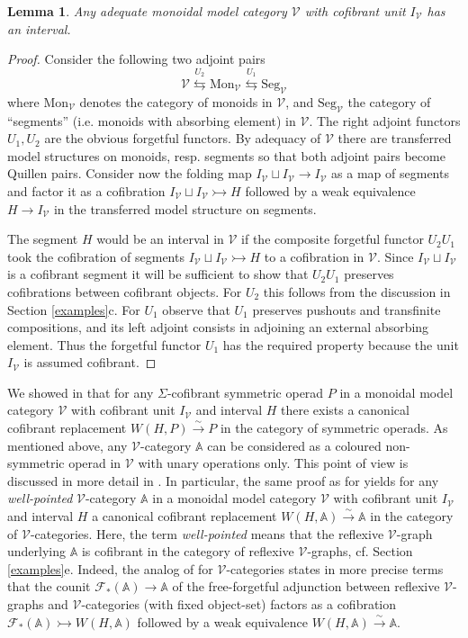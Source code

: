 \documentclass[10pt]{amsart}
\theoremstyle{plain}
\newtheorem{lma}[subsection]{Lemma}
\theoremstyle{remark}
\def\Vv{\mathcal{V}}
\def\Mon{\mathrm{Mon}}
\def\Seg{\mathrm{Seg}}
\def\ito{\rightarrowtail}
\def\eqv{\overset\sim\lrto}
\def\AA{\mathbb{A}}
\def\lra{\leftrightarrows}
\def\Ff{\mathcal{F}}
\def\lrto{\longrightarrow}
\begin{document}
\begin{lma}\label{H}Any adequate monoidal model category $\Vv$ with cofibrant unit $I_\Vv$ has an interval.\end{lma}
\begin{proof}Consider the following two adjoint pairs$$\Vv\overset{U_2}{\lra}\Mon_\Vv\overset{U_1}{\lra}\Seg_\Vv$$where $\Mon_\Vv$ denotes the category of monoids in $\Vv$, and $\Seg_\Vv$ the category of ``segments'' (i.e. monoids with absorbing element) in $\Vv$. The right adjoint functors $U_1,U_2$ are the obvious forgetful functors. By adequacy of $\Vv$ there are transferred model structures on monoids, resp. segments so that both adjoint pairs become Quillen pairs. Consider now the folding map $I_\Vv\sqcup I_\Vv\to I_\Vv$ as a map of segments and factor it as a cofibration $I_\Vv\sqcup I_\Vv\ito H$ followed by a weak equivalence $H\to I_\Vv$ in the transferred model structure on segments.

The segment $H$ would be an interval in $\Vv$ if the composite forgetful functor $U_2U_1$ took the cofibration of segments $I_\Vv\sqcup I_\Vv\ito H$ to a cofibration in $\Vv$. Since $I_\Vv\sqcup I_\Vv$ is a cofibrant segment it will be sufficient to show that $U_2U_1$ preserves cofibrations between cofibrant objects. For $U_2$ this follows from the discussion in Section \ref{examples}c. For $U_1$ observe that $U_1$ preserves pushouts and transfinite compositions, and its left adjoint consists in adjoining an external absorbing element. Thus the forgetful functor $U_1$ has the required property because the unit $I_\Vv$ is assumed cofibrant.\end{proof}

We showed in \cite[Theorem 5.1]{BM1} that for any $\Sigma$-cofibrant symmetric operad $P$ in a monoidal model category $\Vv$ with cofibrant unit $I_\Vv$ and interval $H$ there exists a canonical cofibrant replacement $W(H,P)\eqv P$ in the category of symmetric operads. As mentioned above, any $\Vv$-category $\AA$ can be considered as a coloured non-symmetric operad in $\Vv$ with unary operations only. This point of view is discussed in more detail in \cite{BM2}. In particular, the same proof as for \cite[5.1]{BM1} yields for any \emph{well-pointed} $\Vv$-category $\AA$ in a monoidal model category $\Vv$ with cofibrant unit $I_\Vv$ and interval $H$ a canonical cofibrant replacement $W(H,\AA)\eqv\AA$ in the category of $\Vv$-categories. Here, the term \emph{well-pointed} means that the reflexive $\Vv$-graph underlying $\AA$ is cofibrant in the category of reflexive $\Vv$-graphs, cf. Section \ref{examples}e. Indeed, the analog of \cite[5.1]{BM1} for $\Vv$-categories states in more precise terms that the counit $\Ff_*(\AA)\to\AA$ of the free-forgetful adjunction between reflexive $\Vv$-graphs and $\Vv$-categories (with fixed object-set) factors as a cofibration $\Ff_*(\AA)\ito W(H,\AA)$ followed by a weak equivalence $W(H,\AA)\eqv\AA$.
\end{document}
